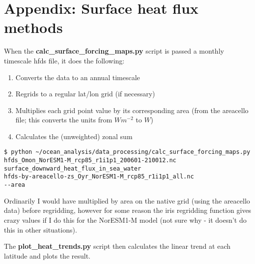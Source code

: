 \section{Appendix: Surface heat flux methods}

When the \textbf{calc_surface_forcing_maps.py} script is passed a monthly timescale hfds file, it does the following:
\begin{enumerate}
\item Converts the data to an annual timescale
\item Regrids to a regular lat/lon grid (if necessary)
\item Multiplies each grid point value by its corresponding area (from the areacello file; this converts the units from $Wm^{-2}$ to $W$)
\item Calculates the (unweighted) zonal sum
\end{enumerate}

\begin{verbatim}
$ python ~/ocean_analysis/data_processing/calc_surface_forcing_maps.py
hfds_Omon_NorESM1-M_rcp85_r1i1p1_200601-210012.nc 
surface_downward_heat_flux_in_sea_water 
hfds-by-areacello-zs_Oyr_NorESM1-M_rcp85_r1i1p1_all.nc 
--area
\end{verbatim}

Ordinarily I would have multiplied by area on the native grid (using the areacello data) before regridding, however for some reason the iris regridding function gives crazy values if I do this for the NorESM1-M model (not sure why - it doesn't do this in other situations). 

The \textbf{plot_heat_trends.py} script then calculates the linear trend at each latitude and plots the result.
